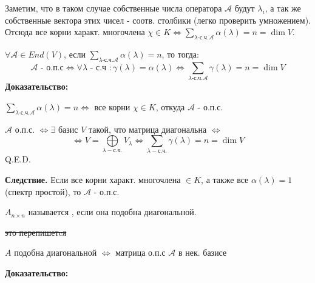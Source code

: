 Заметим, что в таком случае  собственные числа  оператора $\mathcal{A}$ будут $\lambda_i$, а так же собственные вектора этих чисел - соотв. столбики (легко проверить умножением). Отсюда  все корни характ. многочлена  $\chi \in K \Leftrightarrow \sum\limits_{\lambda \text{-с.ч.} \mathcal{A}}\alpha(\lambda) = n = \dim V$.




$\forall \mathcal{A} \in End(V)$, если  $\sum\limits_{\lambda \text{-с.ч.} \mathcal{A}} \alpha(\lambda)= n$, то тогда:
$$\mathcal{A} \text{ - о.п.с} \Leftrightarrow \forall\lambda \text{ - с.ч }: \gamma(\lambda) = \alpha(\lambda) \Leftrightarrow \sum\limits_{\lambda \text{-с.ч.} \mathcal{A}}\gamma(\lambda) = n = \dim V$$
\textbf{Доказательство:}

$ \sum\limits_{\lambda \text{-с.ч.} \mathcal{A}} \alpha(\lambda) = n \Leftrightarrow$ все корни $\chi \in K$, откуда $\mathcal{A}$ -  о.п.с.

$\mathcal{A}$ о.п.с. $\Leftrightarrow \exists$ базис $V$ такой, что матрица диагональна $\Leftrightarrow$ $$\Leftrightarrow V = \bigoplus\limits_{\lambda - \text{с.ч.}}V_{\lambda} \Leftrightarrow \sum\limits_{\lambda - \text{с.ч.}}\gamma(\lambda) = n =\dim V$$
\hfill Q.E.D.

\textbf{Следствие.} Если все корни характ. многочлена $\in K$, а также все $\alpha(\lambda)=1$ (спектр простой), то $\mathcal{A}$ - о.п.с.

 $A_{n\times n}$ называется , если  она подобна диагональной.


\sout{это перепишетcя}

$A$ подобна диагональной $\Leftrightarrow$ матрица о.п.с $\mathcal{A}$ в нек. базисе

\textbf{Доказательство:}

